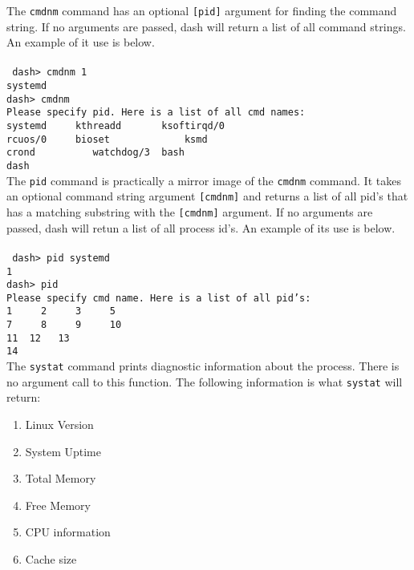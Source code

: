 \documentclass[10pt]{article}
\begin{document}
\newpage

The \texttt{cmdnm} command has an optional \texttt{[pid]} argument for finding the command string. If no arguments are passed, dash will return a list of all command strings.  An example of it use is below.\\\\
\texttt
{
dash> cmdnm 1\\
systemd\\
dash> cmdnm\\
Please specify pid. Here is a list of all cmd names:\\
systemd\,\,\,\, kthreadd\,\,\,\,\,\, ksoftirqd/0\\
rcuos/0\,\,\,\, bioset\,\,\,\,\,\,\,\,\,\,\,\, ksmd\\
crond\,\,\,\,\,\,\,\,\, watchdog/3\, bash\\
dash
}\\

The \texttt{pid} command is practically a mirror image of the \texttt{cmdnm} command. It takes an optional command string argument \texttt{[cmdnm]} and returns a list of all pid's that has a matching substring with the \texttt{[cmdnm]} argument. If no arguments are passed, dash will retun a list of all process id's. An example of its use is below.\\\\
\texttt
{
dash> pid systemd\\
1\\
dash> pid\\
Please specify cmd name. Here is a list of all pid's:\\
1\,\,\,\, 2\,\,\,\, 3\,\,\,\, 5\\
7\,\,\,\, 8\,\,\,\, 9\,\,\,\, 10\\
11\,\,12\,\, 13\\
14
}\\

The \texttt{systat} command prints diagnostic information about the process. There is no argument call to this function. The following information is what \texttt{systat} will return:

\begin{enumerate}[noitemsep]
	\item Linux Version
	\item System Uptime
	\item Total Memory
	\item Free Memory
	\item CPU information
	\item Cache size
\end{enumerate}
\hfill
\end{document}
